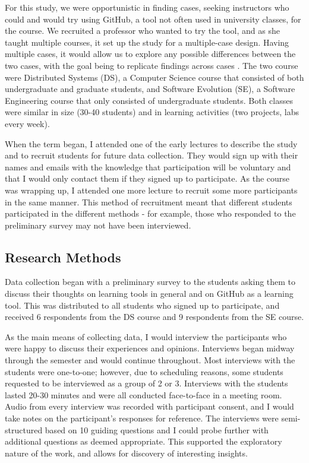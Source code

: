 For this study, we were opportunistic in finding cases, seeking instructors who could and would try using GitHub, a tool not often used in university classes, for the course. We recruited a professor who wanted to try the tool, and as she taught multiple courses, it set up the study for a multiple-case design. Having multiple cases, it would allow us to explore any possible differences between the two cases, with the goal being to replicate findings across cases \cite{yin2013case}. The two course were Distributed Systems (DS), a Computer Science course that consisted of both undergraduate and graduate students, and Software Evolution (SE), a Software Engineering course that only consisted of undergraduate students. Both classes were similar in size (30-40 students) and in learning activities (two projects, labs every week).

When the term began, I attended one of the early lectures to describe the study and to recruit students for future data collection. They would sign up with their names and emails with the knowledge that participation will be voluntary and that I would only contact them if they signed up to participate. As the course was wrapping up, I attended one more lecture to recruit some more participants in the same manner. This method of recruitment meant that different students participated in the different methods - for example, those who responded to the preliminary survey may not have been interviewed.

\subsection{Research Methods}
Data collection began with a preliminary survey to the students asking them to discuss their thoughts on learning tools in general and on GitHub as a learning tool. This was distributed to all students who signed up to participate, and received 6 respondents from the DS course and 9 respondents from the SE course.

As the main means of collecting data, I would interview the participants who were happy to discuss their experiences and opinions. Interviews began midway through the semester and would continue throughout. Most interviews with the students were one-to-one; however, due to scheduling reasons, some students requested to be interviewed as a group of 2 or 3. Interviews with the students lasted 20-30 minutes and were all conducted face-to-face in a meeting room. Audio from every interview was recorded with participant consent, and I would take notes on the participant's responses for reference. The interviews were semi-structured based on 10 guiding questions and I could probe further with additional questions as deemed appropriate. This supported the exploratory nature of the work, and allows for discovery of interesting insights.

